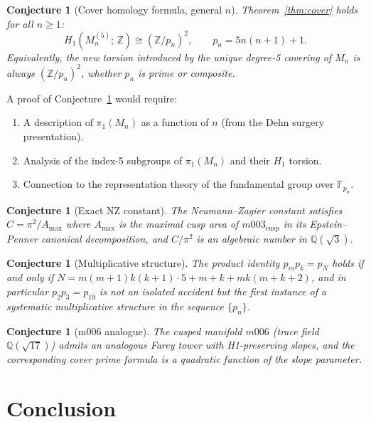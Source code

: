 \documentclass[11pt,a4paper]{article}
\newtheorem{conjecture}[theorem]{Conjecture}
\theoremstyle{definition}
\newcommand{\ZZ}{\mathbb{Z}}
\newcommand{\QQ}{\mathbb{Q}}
\newcommand{\Mn}{M_n}
\newcommand{\Mcusp}{m003_{\mathrm{cusp}}}
\begin{document}
\begin{conjecture}[Cover homology formula, general $n$]
\label{conj:main}
Theorem~\ref{thm:cover} holds for all $n \geq 1$:
\[
  H_1(M_n^{(5)};\,\ZZ) \cong (\ZZ/p_n)^2,
  \qquad p_n = 5n(n+1)+1.
\]
Equivalently, the new torsion introduced by the unique
degree-5 covering of $M_n$ is always $(\ZZ/p_n)^2$,
whether $p_n$ is prime or composite.
\end{conjecture}

A proof of Conjecture~\ref{conj:main} would require:
\begin{enumerate}
\item A description of $\pi_1(\Mn)$ as a function of $n$
  (from the Dehn surgery presentation).
\item Analysis of the index-5 subgroups of $\pi_1(\Mn)$
  and their $H_1$ torsion.
\item Connection to the representation theory of the
  fundamental group over $\mathbb{F}_{p_n}$.
\end{enumerate}

\begin{conjecture}[Exact NZ constant]
The Neumann--Zagier constant satisfies
$C = \pi^2\!/A_{\max}$ where $A_{\max}$ is the maximal cusp area
of $\Mcusp$ in its Epstein--Penner canonical decomposition,
and $C/\pi^2$ is an algebraic number in $\QQ(\sqrt{3})$.
\end{conjecture}

\begin{conjecture}[Multiplicative structure]
The product identity $p_m p_k = p_N$ holds if and only if
$N = m(m+1)k(k+1)\cdot 5 + m+k+mk(m+k+2)$, and in particular
$p_2 p_3 = p_{19}$ is not an isolated accident but the first
instance of a systematic multiplicative structure in the sequence
$\{p_n\}$.
\end{conjecture}

\begin{conjecture}[m006 analogue]
The cusped manifold $m006$ (trace field $\QQ(\sqrt{17})$)
admits an analogous Farey tower with H1-preserving slopes,
and the corresponding cover prime formula is a quadratic
function of the slope parameter.
\end{conjecture}

\section{Conclusion}
\label{sec:conclusion}
\end{document}
